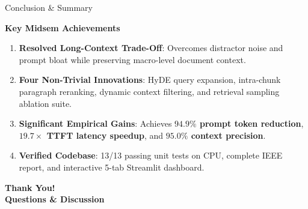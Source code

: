 \documentclass[10pt,aspectratio=169]{beamer}
\begin{document}
\begin{frame}{Conclusion \& Summary}
    \begin{block}{\textbf{Key Midsem Achievements}}
        \begin{enumerate}
            \item \textbf{Resolved Long-Context Trade-Off}: Overcomes distractor noise and prompt bloat while preserving macro-level document context.
            \item \textbf{Four Non-Trivial Innovations}: HyDE query expansion, intra-chunk paragraph reranking, dynamic context filtering, and retrieval sampling ablation suite.
            \item \textbf{Significant Empirical Gains}: Achieves \textbf{$94.9\%$ prompt token reduction}, \textbf{$19.7\times$ TTFT latency speedup}, and \textbf{$95.0\%$ context precision}.
            \item \textbf{Verified Codebase}: 13/13 passing unit tests on CPU, complete IEEE report, and interactive 5-tab Streamlit dashboard.
        \end{enumerate}
    \end{block}
    
    \vspace{0.25cm}
    \begin{center}
        \Huge \textbf{Thank You!} \\
        \vspace{0.15cm}
        \normalsize \textbf{Questions \& Discussion}
    \end{center}
\end{frame}
\end{document}
